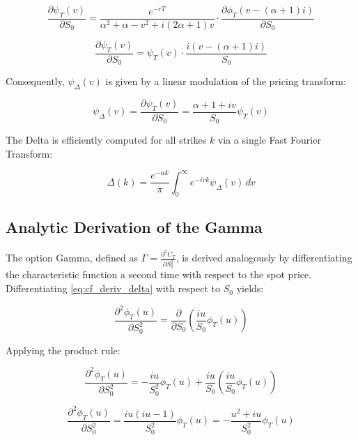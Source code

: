 \documentclass{article}
\begin{document}
\begin{equation}
    \frac{\partial \psi_T(v)}{\partial S_0} = \frac{e^{-rT}}{\alpha^2 + \alpha - v^2 + i(2\alpha+1)v} \cdot \frac{\partial \phi_T(v - (\alpha+1)i)}{\partial S_0}
\end{equation}

\begin{equation}
    \frac{\partial \psi_T(v)}{\partial S_0} = \psi_T(v) \cdot \frac{i(v - (\alpha+1)i)}{S_0}
\end{equation}

Consequently, $\psi_{\Delta}(v)$ is given by a linear modulation of the pricing transform:

\begin{equation}
    \psi_{\Delta}(v) = \frac{\partial \psi_T(v)}{\partial S_0} = \frac{\alpha + 1 + iv}{S_0} \psi_T(v)
\end{equation}

The Delta is efficiently computed for all strikes $k$ via a single Fast Fourier Transform:

\begin{equation}
    \Delta(k) = \frac{e^{-\alpha k}}{\pi} \int_{0}^{\infty} e^{-ivk} \psi_{\Delta}(v) \, dv
\end{equation}



\subsection{Analytic Derivation of the Gamma}

The option Gamma, defined as $\Gamma = \frac{\partial^2 C_T}{\partial S_0^2}$, is derived analogously by differentiating the characteristic function a second time with respect to the spot price. Differentiating \eqref{eq:cf_deriv_delta} with respect to $S_0$ yields:

\begin{equation}
    \frac{\partial^2 \phi_T(u)}{\partial S_0^2} = \frac{\partial}{\partial S_0} \left( \frac{iu}{S_0} \phi_T(u) \right)
\end{equation}

Applying the product rule:

\begin{equation}
    \frac{\partial^2 \phi_T(u)}{\partial S_0^2} = -\frac{iu}{S_0^2}\phi_T(u) + \frac{iu}{S_0} \left( \frac{iu}{S_0} \phi_T(u) \right)
\end{equation}

\begin{equation}
    \frac{\partial^2 \phi_T(u)}{\partial S_0^2} = \frac{iu(iu - 1)}{S_0^2} \phi_T(u) = -\frac{u^2 + iu}{S_0^2} \phi_T(u)
\end{equation}
\end{document}
